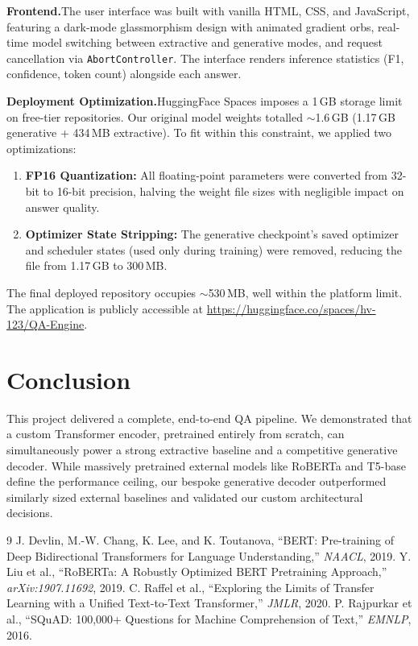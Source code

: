 \documentclass[10pt,twocolumn]{article}
\begin{document}
\textbf{Frontend.}\quad The user interface was built with vanilla HTML, CSS, and JavaScript, featuring a dark-mode glassmorphism design with animated gradient orbs, real-time model switching between extractive and generative modes, and request cancellation via \texttt{AbortController}. The interface renders inference statistics (F1, confidence, token count) alongside each answer.

\textbf{Deployment Optimization.}\quad HuggingFace Spaces imposes a 1\,GB storage limit on free-tier repositories. Our original model weights totalled $\sim$1.6\,GB (1.17\,GB generative + 434\,MB extractive). To fit within this constraint, we applied two optimizations:
\begin{enumerate}[leftmargin=1.2em,noitemsep,topsep=2pt]
    \item \textbf{FP16 Quantization:} All floating-point parameters were converted from 32-bit to 16-bit precision, halving the weight file sizes with negligible impact on answer quality.
    \item \textbf{Optimizer State Stripping:} The generative checkpoint's saved optimizer and scheduler states (used only during training) were removed, reducing the file from 1.17\,GB to 300\,MB.
\end{enumerate}
The final deployed repository occupies $\sim$530\,MB, well within the platform limit. The application is publicly accessible at \url{https://huggingface.co/spaces/hv-123/QA-Engine}.

\section{Conclusion}
This project delivered a complete, end-to-end QA pipeline. We demonstrated that a custom Transformer encoder, pretrained entirely from scratch, can simultaneously power a strong extractive baseline and a competitive generative decoder. While massively pretrained external models like RoBERTa and T5-base define the performance ceiling, our bespoke generative decoder outperformed similarly sized external baselines and validated our custom architectural decisions.

\begin{thebibliography}{9}\small
{}
J. Devlin, M.-W. Chang, K. Lee, and K. Toutanova, ``BERT: Pre-training of Deep Bidirectional Transformers for Language Understanding,'' \textit{NAACL}, 2019.
Y. Liu et al., ``RoBERTa: A Robustly Optimized BERT Pretraining Approach,'' \textit{arXiv:1907.11692}, 2019.
C. Raffel et al., ``Exploring the Limits of Transfer Learning with a Unified Text-to-Text Transformer,'' \textit{JMLR}, 2020.
P. Rajpurkar et al., ``SQuAD: 100,000+ Questions for Machine Comprehension of Text,'' \textit{EMNLP}, 2016.
\end{thebibliography}
\end{document}
